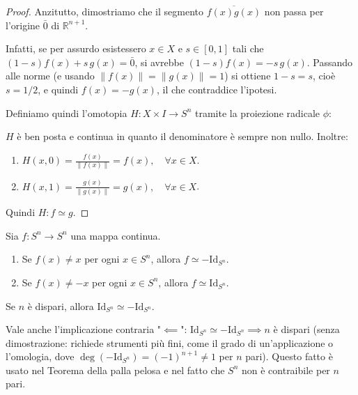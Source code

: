 
\begin{proof}
Anzitutto, dimostriamo che il segmento $\overline{f(x)g(x)}$ non passa per l'origine $\bar{0}$ di $\mathbb{R}^{n+1}$. 

Infatti, se per assurdo esistessero $x \in X$ e $s \in [0,1]$ tali che $(1-s)f(x) + s\,g(x) = \bar{0}$, si avrebbe $(1-s)f(x) = -s\,g(x)$. Passando alle norme (e usando $\|f(x)\| = \|g(x)\| = 1$) si ottiene $1-s = s$, cio\`e $s = 1/2$, e quindi $f(x) = -g(x)$, il che contraddice l'ipotesi.

Definiamo quindi l'omotopia $H: X \times I \to S^n$ tramite la proiezione radicale $\phi$:

$H$ è ben posta e continua in quanto il denominatore è sempre non nullo. Inoltre:
\begin{enumerate}[label=\roman*)]
    \item $H(x,0) = \frac{f(x)}{\|f(x)\|} = f(x), \quad \forall x \in X$.
    \item $H(x,1) = \frac{g(x)}{\|g(x)\|} = g(x), \quad \forall x \in X$.
\end{enumerate}
Quindi $H: f \simeq g$.
\end{proof}

\begin{coro}
Sia $f: S^n \to S^n$ una mappa continua.
\begin{enumerate}
    \item Se $f(x) \neq x$ per ogni $x \in S^n$, allora $f \simeq -\mathrm{Id}_{S^n}$.
    \item Se $f(x) \neq -x$ per ogni $x \in S^n$, allora $f \simeq \mathrm{Id}_{S^n}$.
\end{enumerate}
\end{coro}

\begin{prop}
Se $n$ è dispari, allora $\mathrm{Id}_{S^n} \simeq -\mathrm{Id}_{S^n}$.
\end{prop}

\begin{observacion}
Vale anche l'implicazione contraria "$\impliedby$": $\mathrm{Id}_{S^n} \simeq -\mathrm{Id}_{S^n} \implies n$ è dispari (senza dimostrazione: richiede strumenti pi\`u fini, come il grado di un'applicazione o l'omologia, dove $\deg(-\mathrm{Id}_{S^n}) = (-1)^{n+1} \neq 1$ per $n$ pari). Questo fatto \`e usato nel Teorema della palla pelosa e nel fatto che $S^n$ non \`e contraibile per $n$ pari.
\end{observacion}

